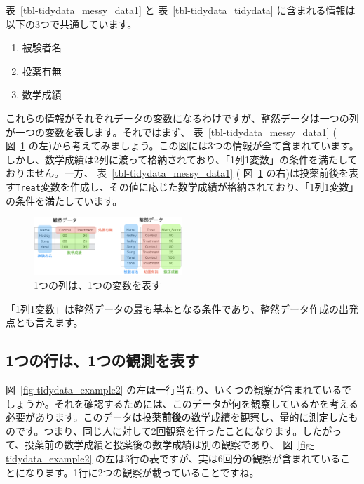 \documentclass[
  a4paper,
  pandoc,
  ja=standard,
  jafont=haranoaji]{bxjsbook}
\providecommand{\tightlist}{%
  \setlength{\itemsep}{0pt}\setlength{\parskip}{0pt}}
\begin{document}
表~\ref{tbl-tidydata_messy_data1} と 表~\ref{tbl-tidydata_tidydata}
に含まれる情報は以下の3つで共通しています。

\begin{enumerate}
\def\labelenumi{\arabic{enumi}.}
\tightlist
\item
  被験者名
\item
  投薬有無
\item
  数学成績
\end{enumerate}

これらの情報がそれぞれデータの変数になるわけですが、整然データは一つの列が一つの変数を表します。それではまず、
表~\ref{tbl-tidydata_messy_data1} ( 図~\ref{fig-tidydata_example1}
の左)から考えてみましょう。この図には3つの情報が全て含まれています。しかし、数学成績は2列に渡って格納されており、「1列1変数」の条件を満たしておりません。一方、
表~\ref{tbl-tidydata_messy_data1} ( 図~\ref{fig-tidydata_example1}
の右)は投薬前後を表す\texttt{Treat}変数を作成し、その値に応じた数学成績が格納されており、「1列1変数」の条件を満たしています。

\begin{figure}

{\centering \includegraphics[width=0.5\textwidth,height=\textheight]{./Figs/Tidydata/TidyData1.png}

}

\caption{\label{fig-tidydata_example1}1つの列は、1つの変数を表す}

\end{figure}

「1列1変数」は整然データの最も基本となる条件であり、整然データ作成の出発点とも言えます。

\hypertarget{ux3064ux306eux884cux306f1ux3064ux306eux89b3ux6e2cux3092ux8868ux3059}{%
\subsection{1つの行は、1つの観測を表す}\label{ux3064ux306eux884cux306f1ux3064ux306eux89b3ux6e2cux3092ux8868ux3059}}

図~\ref{fig-tidydata_example2}
の左は一行当たり、いくつの観察が含まれているでしょうか。それを確認するためには、このデータが何を観察しているかを考える必要があります。このデータは投薬\textbf{前後}の数学成績を観察し、量的に測定したものです。つまり、同じ人に対して2回観察を行ったことになります。したがって、投薬前の数学成績と投薬後の数学成績は別の観察であり、
図~\ref{fig-tidydata_example2}
の左は3行の表ですが、実は6回分の観察が含まれていることになります。1行に2つの観察が載っていることですね。
\end{document}
